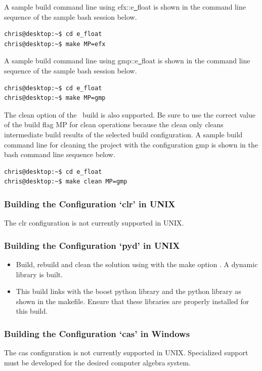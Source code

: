 \noindent A sample build command line using {\courier efx::e\underline\ float} is shown in
the command line sequence of the sample bash session below.

\vspace{6.0pt}

\begin{lstlisting}
chris@desktop:~$ cd e_float
chris@desktop:~$ make MP=efx
\end{lstlisting}

\noindent A sample build command line using {\courier gmp::e\underline\ float} is shown in
the command line sequence of the sample bash session below.

\vspace{6.0pt}

\begin{lstlisting}
chris@desktop:~$ cd e_float
chris@desktop:~$ make MP=gmp
\end{lstlisting}

\noindent The {\courier clean} option of the \efloat\ build is also supported.
Be sure to use the correct value of the build flag {\courier MP} for clean
operations because the clean only cleans intermediate build results of the
selected build configuration. A sample build command line for cleaning the
project with the configuration {\courier gmp} is shown in the bash command
line sequence below.

\vspace{6.0pt}

\begin{lstlisting}
chris@desktop:~$ cd e_float
chris@desktop:~$ make clean MP=gmp
\end{lstlisting}


\subsubsection{Building the Configuration `clr' in UNIX}

The {\courier clr} configuration is not currently supported in UNIX.

\subsubsection{Building the Configuration `pyd' in UNIX}

\begin{itemize}
\item Build, rebuild and clean the solution using {}
with the make option {}. A dynamic library is built.
\item This build links with the boost python library and the python library
as shown in the makefile. Ensure that these libraries
are properly installed for this build.
\end{itemize}

\subsubsection{Building the Configuration `cas' in Windows{\footnotesize {\textregistered}}}

The {\courier cas} configuration is not currently supported in UNIX.
Specialized support must be developed for the desired computer algebra system.

